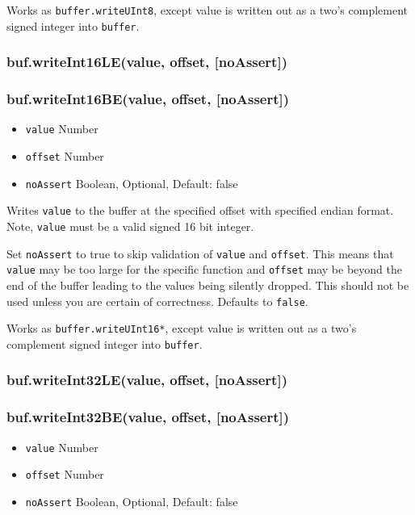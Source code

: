 Works as \texttt{buffer.writeUInt8}, except value is written out as a
two's complement signed integer into \texttt{buffer}.

\subsubsection{buf.writeInt16LE(value, offset, {[}noAssert{]})}

\subsubsection{buf.writeInt16BE(value, offset, {[}noAssert{]})}

\begin{itemize}
\item
  \texttt{value} Number
\item
  \texttt{offset} Number
\item
  \texttt{noAssert} Boolean, Optional, Default: false
\end{itemize}

Writes \texttt{value} to the buffer at the specified offset with
specified endian format. Note, \texttt{value} must be a valid signed 16
bit integer.

Set \texttt{noAssert} to true to skip validation of \texttt{value} and
\texttt{offset}. This means that \texttt{value} may be too large for the
specific function and \texttt{offset} may be beyond the end of the
buffer leading to the values being silently dropped. This should not be
used unless you are certain of correctness. Defaults to \texttt{false}.

Works as \texttt{buffer.writeUInt16*}, except value is written out as a
two's complement signed integer into \texttt{buffer}.

\subsubsection{buf.writeInt32LE(value, offset, {[}noAssert{]})}

\subsubsection{buf.writeInt32BE(value, offset, {[}noAssert{]})}

\begin{itemize}
\item
  \texttt{value} Number
\item
  \texttt{offset} Number
\item
  \texttt{noAssert} Boolean, Optional, Default: false
\end{itemize}

